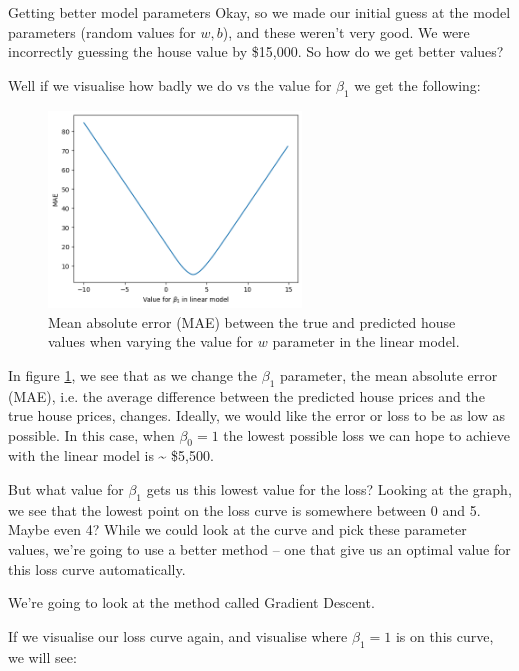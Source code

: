 \documentclass[10pt]{beamer}
\begin{document}
\begin{frame}[fragile,allowframebreaks,label=]{Getting better model parameters}
Okay, so we made our initial guess at the model parameters (random values for \(w,
b\)), and these weren't very good. We were incorrectly guessing the house value by
\$15,000. So how do we get better values?

Well if we visualise how badly we do vs the value for \(\beta_1\) we get the following:

\begin{figure}[htbp]
\centering
\includegraphics[width=0.6\textwidth]{images/plot_linear_model_loss_w.png}
\caption{\label{fig:mae_lm}Mean absolute error (MAE) between the true and predicted house values when varying the value for \(w\) parameter in the linear model.}
\end{figure}

In figure \ref{fig:mae_lm}, we see that as we change the \(\beta_1\) parameter, the mean absolute
error (MAE), i.e. the average difference between the predicted house prices and the
true house prices, changes. Ideally, we would like the error or \alert{loss} to be as low as
possible. In this case, when \(\beta_0 = 1\) the lowest possible loss we can hope to achieve
with the linear model is \textasciitilde{} \$5,500.

But what value for \(\beta_1\) gets us this lowest value for the loss? Looking at the graph,
we see that the lowest point on the loss curve is somewhere between 0 and 5. Maybe
even 4? While we could look at the curve and pick these parameter values, we're going
to use a better method -- one that give us an optimal value for this loss curve
automatically.

We're going to look at the method called \alert{Gradient Descent}.

If we visualise our loss curve again, and visualise where \(\beta_1 = 1\) is on this curve,
we will see:


\end{frame}
\end{document}
